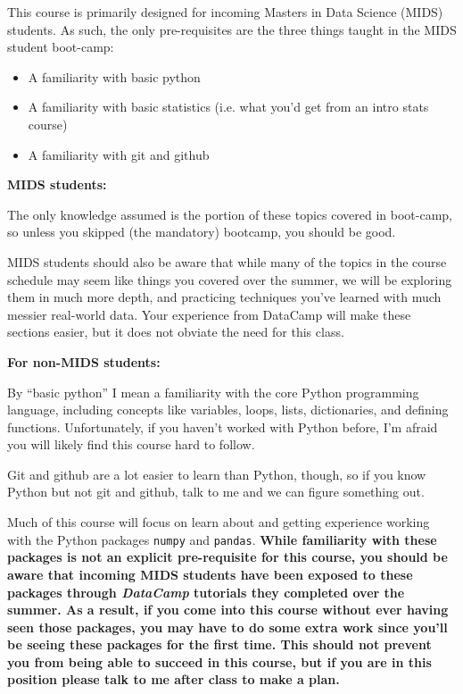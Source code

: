 \documentclass[12pt]{article}
\begin{document}
This course is primarily designed for incoming Masters in Data Science (MIDS) students. As such, the only pre-requisites are the three things taught in the MIDS student boot-camp:

\begin{itemize}
	\item A familiarity with basic python
	\item A familiarity with basic statistics (i.e. what you'd get from an intro stats course)
	\item A familiarity with git and github
\end{itemize}

\textbf{MIDS students:}

The only knowledge assumed is the portion of these topics covered in boot-camp, so unless you skipped (the mandatory) bootcamp, you should be good.

MIDS students should also be aware that while many of the topics in the course schedule may seem like things you covered over the summer, we will be exploring them in much more depth, and practicing techniques you've learned with much messier real-world data. Your experience from DataCamp will make these sections easier, but it does not obviate the need for this class.

\textbf{For non-MIDS students:}

By ``basic python'' I mean a familiarity with the core Python programming language, including concepts like variables, loops, lists, dictionaries, and defining functions. Unfortunately, if you haven't worked with Python before, I'm afraid you will likely find this course hard to follow.

Git and github are a lot easier to learn than Python, though, so if you know Python but not git and github, talk to me and we can figure something out.

Much of this course will focus on learn about and getting experience working with the Python packages \texttt{numpy} and \texttt{pandas}. \textbf{While familiarity with these packages is not an explicit pre-requisite for this course, you should be aware that incoming MIDS students have been exposed to these packages through \emph{DataCamp} tutorials they completed over the summer. As a result, if you come into this course without ever having seen those packages, you may have to do some extra work since you'll be seeing these packages for the first time. This should not prevent you from being able to succeed in this course, but if you are in this position please talk to me after class to make a plan.}
\end{document}
